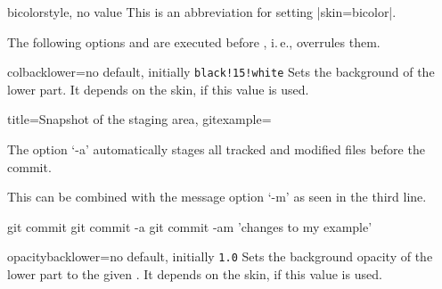 \clearpage

\begin{docTcbKey}{bicolor}{}{style, no value}
  This is an abbreviation for setting |skin=bicolor|.
\end{docTcbKey}


\begin{dispExample}
\end{dispExample}

\clearpage


\begin{marker}
  The following options  and 
  are executed before , i.\,e.,
   overrules them.
\end{marker}

\begin{docTcbKey}{colbacklower}{=}{no default, initially \texttt{black!15!white}}
  Sets the background  of the lower part. It depends on the skin,
  if this value is used.
\end{docTcbKey}

\begin{dispExample}

\begin{tcblisting}{title={Snapshot of the staging area},
  gitexample={The option `-a' automatically stages all tracked and modified
              files before the commit.\par
              This can be combined with the message option `-m'
              as seen in the third line.}}
git commit
git commit -a
git commit -am 'changes to my example'
\end{tcblisting}
\end{dispExample}

\smallskip

\begin{docTcbKey}[][doc new=2021-05-21]{opacitybacklower}{=}{no default, initially \texttt{1.0}}
  Sets the background opacity of the lower part to the given .
  It depends on the skin, if this value is used.
\end{docTcbKey}

